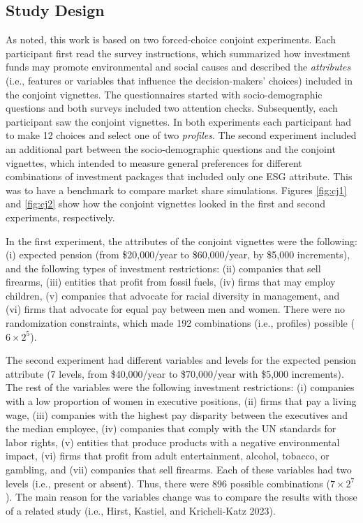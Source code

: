 \documentclass[
  12pt,
]{article}
\begin{document}
\hypertarget{study-design}{%
\subsection{Study Design}\label{study-design}}

As noted, this work is based on two forced-choice conjoint experiments. Each participant first read the survey instructions, which summarized how investment funds may promote environmental and social causes and described the \emph{attributes} (i.e., features or variables that influence the decision-makers' choices) included in the conjoint vignettes. The questionnaires started with socio-demographic questions and both surveys included two attention checks. Subsequently, each participant saw the conjoint vignettes. In both experiments each participant had to make 12 choices and select one of two \emph{profiles}. The second experiment included an additional part between the socio-demographic questions and the conjoint vignettes, which intended to measure general preferences for different combinations of investment packages that included only one ESG attribute. This was to have a benchmark to compare market share simulations. Figures \ref{fig:cj1} and \ref{fig:cj2} show how the conjoint vignettes looked in the first and second experiments, respectively.

In the first experiment, the attributes of the conjoint vignettes were the following: (i) expected pension (from \$20,000/year to \$60,000/year, by \$5,000 increments), and the following types of investment restrictions: (ii) companies that sell firearms, (iii) entities that profit from fossil fuels, (iv) firms that may employ children, (v) companies that advocate for racial diversity in management, and (vi) firms that advocate for equal pay between men and women. There were no randomization constraints, which made 192 combinations (i.e., profiles) possible (\(6 \times 2^5\)).

The second experiment had different variables and levels for the expected pension attribute (7 levels, from \$40,000/year to \$70,000/year with \$5,000 increments). The rest of the variables were the following investment restrictions: (i) companies with a low proportion of women in executive positions, (ii) firms that pay a living wage, (iii) companies with the highest pay disparity between the executives and the median employee, (iv) companies that comply with the UN standards for labor rights, (v) entities that produce products with a negative environmental impact, (vi) firms that profit from adult entertainment, alcohol, tobacco, or gambling, and (vii) companies that sell firearms. Each of these variables had two levels (i.e., present or absent). Thus, there were 896 possible combinations (\(7 \times 2^7\)). The main reason for the variables change was to compare the results with those of a related study (i.e., Hirst, Kastiel, and Kricheli-Katz 2023).
\end{document}
